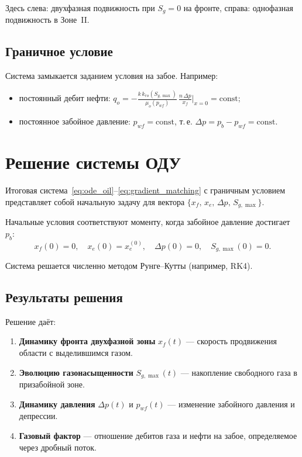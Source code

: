 \documentclass[12pt,a4paper]{article}
\begin{document}
Здесь слева: двухфазная подвижность при $S_g=0$ на фронте,
справа: однофазная подвижность в Зоне~II.

\subsection{Граничное условие}

Система замыкается заданием условия на забое. Например:
\begin{itemize}
  \item постоянный дебит нефти:
    $\displaystyle q_o = -\frac{k\,k_{ro}(S_{g,\max})}{\mu_o(p_{wf})}\,
    \frac{n\,\Delta p}{x_f}\bigg|_{x=0} = \mathrm{const}$;
  \item постоянное забойное давление: $p_{wf} = \mathrm{const}$,
    т.\,е. $\Delta p = p_b - p_{wf} = \mathrm{const}$.
\end{itemize}

\section{Решение системы ОДУ}

Итоговая система~\eqref{eq:ode_oil}--\eqref{eq:gradient_matching}
с граничным условием представляет собой начальную задачу для
вектора $\{x_f,\, x_e,\, \Delta p,\, S_{g,\max}\}$.

Начальные условия соответствуют моменту, когда забойное давление
достигает~$p_b$:
\[
  x_f(0) = 0, \quad x_e(0) = x_e^{(0)}, \quad
  \Delta p(0) = 0, \quad S_{g,\max}(0) = 0.
\]

Система решается численно методом Рунге--Кутты (например, RK4).

\subsection{Результаты решения}

Решение даёт:
\begin{enumerate}
  \item \textbf{Динамику фронта двухфазной зоны} $x_f(t)$ ---
    скорость продвижения области с выделившимся газом.
  \item \textbf{Эволюцию газонасыщенности} $S_{g,\max}(t)$ ---
    накопление свободного газа в призабойной зоне.
  \item \textbf{Динамику давления} $\Delta p(t)$ и $p_{wf}(t)$ ---
    изменение забойного давления и депрессии.
  \item \textbf{Газовый фактор} --- отношение дебитов газа и нефти
    на забое, определяемое через дробный поток.
\end{enumerate}
\end{document}
